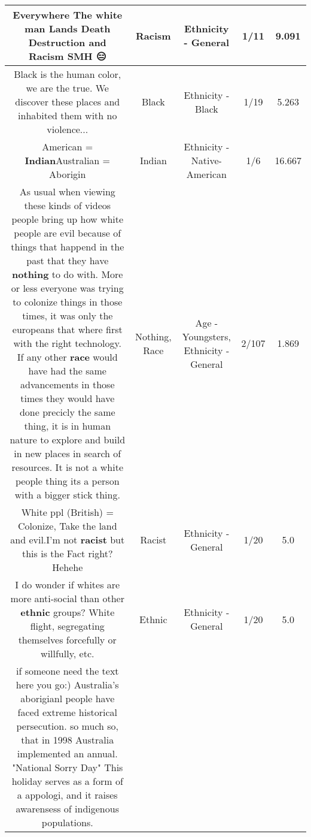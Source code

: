 \documentclass[11pt]{article}
\newlength\mylength
\begin{document}
\begin{center}
\begin{longtable}{|C{.65\mylength}|C{.30\mylength}|C{.12\mylength}|C{.12\mylength}|C{.12\mylength}|}
  \small Everywhere  The white man Lands Death  Destruction  and \textbf{Racism} SMH 😑\normalsize   & Racism & Ethnicity - General & 1/11 & 9.091 \\  \hline
  \small Black is the human color, we are the true. We discover these places and inhabited them with no violence...\normalsize   & Black & Ethnicity - Black & 1/19 & 5.263 \\  \hline
  \small American = \textbf{Indian}Australian = Aborigin\normalsize   & Indian & Ethnicity - Native-American & 1/6 & 16.667 \\  \hline
  \small As usual when viewing these kinds of videos people bring up how white people are evil because of things that happend in the past that they have \textbf{nothing} to do with. More or less everyone was trying to colonize things in those times, it was only the europeans that where first with the right technology. If any other \textbf{race} would have had the same advancements in those times they would have done precicly the same thing, it is in human nature to explore and build in new places in search of resources. It is not a white people thing its a person with a bigger stick thing.\normalsize   & Nothing, Race & Age - Youngsters, Ethnicity - General & 2/107 & 1.869 \\  \hline
  \small White ppl (British) = Colonize, Take the land and evil.I'm not \textbf{racist} but this is the Fact right? Hehehe\normalsize   & Racist & Ethnicity - General & 1/20 & 5.0 \\  \hline
  \small I do wonder if whites are more anti-social than other \textbf{ethnic} groups? White flight, segregating themselves forcefully or willfully, etc.\normalsize   & Ethnic & Ethnicity - General & 1/20 & 5.0 \\  \hline
  \small if someone need the text here you go:) Australia's aborigianl people have faced extreme historical persecution. so much so, that in 1998 Australia implemented an annual. "National Sorry Day" This holiday serves as a form of a appologi, and it raises awarensess of indigenous populations. 

\end{longtable}
\end{center}
\end{document}

